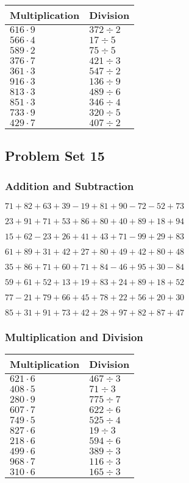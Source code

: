 \begin{longtable}[]{@{}ll@{}}
\toprule
Multiplication & Division\tabularnewline
\midrule
\endhead
\(616\cdot9\) & \(372÷2\)\tabularnewline
\(566\cdot4\) & \(17÷5\)\tabularnewline
\(589\cdot2\) & \(75÷5\)\tabularnewline
\(376\cdot7\) & \(421÷3\)\tabularnewline
\(361\cdot3\) & \(547÷2\)\tabularnewline
\(916\cdot3\) & \(136÷9\)\tabularnewline
\(813\cdot3\) & \(489÷6\)\tabularnewline
\(851\cdot3\) & \(346÷4\)\tabularnewline
\(733\cdot9\) & \(320÷5\)\tabularnewline
\(429\cdot7\) & \(407÷2\)\tabularnewline
\bottomrule
\end{longtable}

\hypertarget{problem-set-15}{%
\subsection{Problem Set 15}\label{problem-set-15}}

\hypertarget{addition-and-subtraction-14}{%
\subsubsection{Addition and
Subtraction}\label{addition-and-subtraction-14}}

\(71+82+63+39-19+81+90-72-52+73\)

\(23+91+71+53+86+80+40+89+18+94\)

\(15+62-23+26+41+43+71-99+29+83\)

\(61+89+31+42+27+80+49+42+80+48\)

\(35+86+71+60+71+84-46+95+30-84\)

\(59+61+52+13+19+83+24+89+18+52\)

\(77-21+79+66+45+78+22+56+20+30\)

\(85+31+91+73+42+28+97+82+87+47\)

\hypertarget{multiplication-and-division-14}{%
\subsubsection{Multiplication and
Division}\label{multiplication-and-division-14}}

\begin{longtable}[]{@{}ll@{}}
\toprule
Multiplication & Division\tabularnewline
\midrule
\endhead
\(621\cdot6\) & \(467÷3\)\tabularnewline
\(408\cdot5\) & \(71÷3\)\tabularnewline
\(280\cdot9\) & \(775÷7\)\tabularnewline
\(607\cdot7\) & \(622÷6\)\tabularnewline
\(749\cdot5\) & \(525÷4\)\tabularnewline
\(827\cdot6\) & \(19÷3\)\tabularnewline
\(218\cdot6\) & \(594÷6\)\tabularnewline
\(499\cdot6\) & \(389÷3\)\tabularnewline
\(968\cdot7\) & \(116÷3\)\tabularnewline
\(310\cdot6\) & \(165÷3\)\tabularnewline
\bottomrule
\end{longtable}

